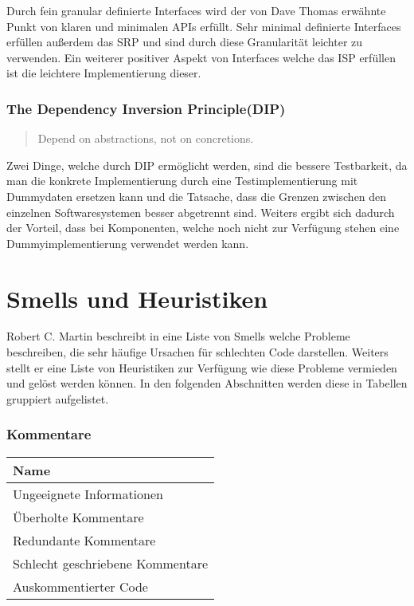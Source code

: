Durch fein granular definierte Interfaces wird der von Dave Thomas erwähnte Punkt von klaren und minimalen APIs erfüllt. Sehr minimal definierte Interfaces erfüllen außerdem das SRP und sind durch diese Granularität leichter zu verwenden. Ein weiterer positiver Aspekt von Interfaces welche das ISP erfüllen ist die leichtere Implementierung dieser.

\subsubsection{The Dependency Inversion Principle(DIP)}
\begin{quotation}
	Depend on abstractions, not on concretions.
\end{quotation}

Zwei Dinge, welche durch DIP ermöglicht werden, sind die bessere Testbarkeit, da man die konkrete Implementierung durch eine Testimplementierung mit Dummydaten ersetzen kann und die Tatsache, dass die Grenzen zwischen den einzelnen Softwaresystemen besser abgetrennt sind. Weiters ergibt sich dadurch der Vorteil, dass bei Komponenten, welche noch nicht zur Verfügung stehen eine Dummyimplementierung verwendet werden kann. 

\section{Smells und Heuristiken}
Robert C. Martin beschreibt in \cite{Martin2008} eine Liste von Smells welche Probleme beschreiben, die sehr häufige Ursachen für schlechten Code darstellen. Weiters stellt er eine Liste von Heuristiken zur Verfügung wie diese Probleme vermieden und gelöst werden können. In den folgenden Abschnitten werden diese in Tabellen gruppiert aufgelistet. 

\subsubsection{Kommentare}

\begin{table}[H]
	\centering
		 \begin{tabular}{ | l | }
		 \hline
			Name \\  \hline
			Ungeeignete Informationen\\
			Überholte Kommentare  \\
			Redundante Kommentare \\
			Schlecht geschriebene Kommentare  \\
			Auskommentierter Code \\ \hline
		\end{tabular}
	\label{tab:SmellsUndHeuristiken_Comments}
\end{table}

